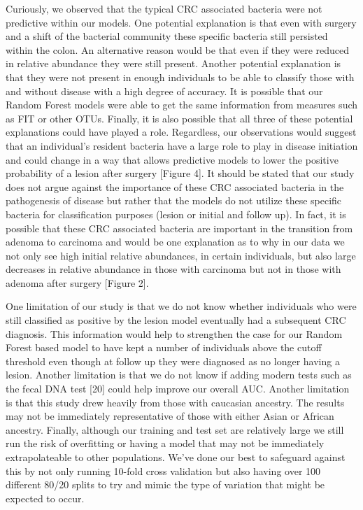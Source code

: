 \documentclass[12pt,]{article}
\begin{document}
Curiously, we observed that the typical CRC associated bacteria were not
predictive within our models. One potential explanation is that even
with surgery and a shift of the bacterial community these specific
bacteria still persisted within the colon. An alternative reason would
be that even if they were reduced in relative abundance they were still
present. Another potential explanation is that they were not present in
enough individuals to be able to classify those with and without disease
with a high degree of accuracy. It is possible that our Random Forest
models were able to get the same information from measures such as FIT
or other OTUs. Finally, it is also possible that all three of these
potential explanations could have played a role. Regardless, our
observations would suggest that an individual's resident bacteria have a
large role to play in disease initiation and could change in a way that
allows predictive models to lower the positive probability of a lesion
after surgery {[}Figure 4{]}. It should be stated that our study does
not argue against the importance of these CRC associated bacteria in the
pathogenesis of disease but rather that the models do not utilize these
specific bacteria for classification purposes (lesion or initial and
follow up). In fact, it is possible that these CRC associated bacteria
are important in the transition from adenoma to carcinoma and would be
one explanation as to why in our data we not only see high initial
relative abundances, in certain individuals, but also large decreases in
relative abundance in those with carcinoma but not in those with adenoma
after surgery {[}Figure 2{]}.

One limitation of our study is that we do not know whether individuals
who were still classified as positive by the lesion model eventually had
a subsequent CRC diagnosis. This information would help to strengthen
the case for our Random Forest based model to have kept a number of
individuals above the cutoff threshold even though at follow up they
were diagnosed as no longer having a lesion. Another limitation is that
we do not know if adding modern tests such as the fecal DNA test
{[}20{]} could help improve our overall AUC. Another limitation is that
this study drew heavily from those with caucasian ancestry. The results
may not be immediately representative of those with either Asian or
African ancestry. Finally, although our training and test set are
relatively large we still run the risk of overfitting or having a model
that may not be immediately extrapolateable to other populations. We've
done our best to safeguard against this by not only running 10-fold
cross validation but also having over 100 different 80/20 splits to try
and mimic the type of variation that might be expected to occur.
\end{document}
